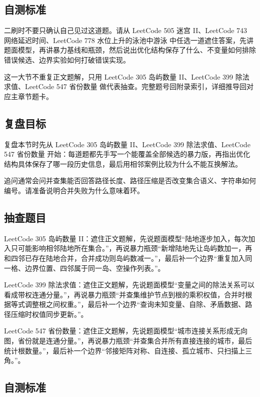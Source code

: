 \subsection{自测标准}

二刷时不要只确认自己见过这道题。请从 LeetCode 505 迷宫 II、LeetCode 743 网络延迟时间、LeetCode 778 水位上升的泳池中游泳 中任选一道遮住答案，先讲题面模型，再讲暴力基线和瓶颈，然后说出优化结构保存了什么、不变量如何排除错误候选、边界实验如何打破错误实现。

这一大节不重复正文题解，只用 LeetCode 305 岛屿数量 II、LeetCode 399 除法求值、LeetCode 547 省份数量 做代表抽查。完整题号回附录索引，详细推导回对应主章节题卡。

\subsection{复盘目标}

复盘本节时先从 LeetCode 305 岛屿数量 II、LeetCode 399 除法求值、LeetCode 547 省份数量 开始：每道题都先手写一个能覆盖全部候选的暴力版，再指出优化结构具体保存了哪一段历史信息，最后用相邻案例比较为什么不能互换解法。

追问通常会问并查集能否回答路径长度、路径压缩是否改变集合语义、字符串如何编号。请准备说明合并失败为什么意味着环。

\subsection{抽查题目}

LeetCode 305 岛屿数量 II：遮住正文题解，先说题面模型“陆地逐步加入，每次加入只可能影响相邻陆地所在集合。”，再说暴力瓶颈“新增陆地先让岛屿数加一，再和四邻已存在陆地合并，合并成功则岛屿数减一。”，最后补一个边界“重复加入同一格、边界位置、四邻属于同一岛、空操作列表。”。

LeetCode 399 除法求值：遮住正文题解，先说题面模型“变量之间的除法关系可以看成带权连通分量。”，再说暴力瓶颈“并查集维护节点到根的乘积权值，合并时根据等式调整根之间权重。”，最后补一个边界“查询未知变量、自除、矛盾数据、路径压缩时权值同步更新。”。

LeetCode 547 省份数量：遮住正文题解，先说题面模型“城市连接关系形成无向图，省份就是连通分量。”，再说暴力瓶颈“并查集合并所有直接连接的城市，最后统计根数量。”，最后补一个边界“邻接矩阵对称、自连接、孤立城市、只扫描上三角。”。

\subsection{自测标准}

